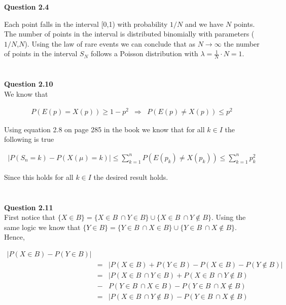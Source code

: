 \documentclass[10pt,a4paper]{article}
\begin{document}
\begin{flushleft}

\begin{eqnarray*}
\\
\end{eqnarray*}


\textbf{Question 2.4}

Each point falls in the interval [0,1) with probability $1/N$ and
we have $N$ points. The number of points in the interval is
distributed binomially with parameters ($1/N$,$N$). Using the law
of rare events we can conclude that as $N \rightarrow \infty$  the
number of points in the interval $S_N$ follows a Poisson
distribution with $\lambda=\frac{1}{N}\cdot N=1$.


\begin{eqnarray*}
\\
\end{eqnarray*}

\textbf{Question 2.10}\\


We know that

\begin{eqnarray*}
P(E(p)=X(p))\geq 1-p^2  &\Rightarrow&  P(E(p)\neq X(p))\leq p^2
\end{eqnarray*}

Using equation 2.8 on page 285 in the book we know that for all
$k\in I$ the following is true

\begin{eqnarray*}
|P(S_n=k)-P(X(\mu)=k)|\leq \sum_{k=1}^n P(E(p_k)\neq X(p_k))\leq
\sum_{k=1}^n p_k^2
\end{eqnarray*}

Since this holds for all $k\in I$ the desired result holds.


\begin{eqnarray*}
\\
\end{eqnarray*}

\textbf{Question 2.11}\\


First notice that $\{X \in B\}=\{X \in B\ \cap Y \in B\}\cup \{X
\in B\ \cap Y \not \in B\}$. Using the same logic we know that
$\{Y \in B\}=\{Y \in B\ \cap X \in B\}\cup \{Y \in B\ \cap X \not
\in B\}$. Hence,


\begin{eqnarray*}
|P(X \in B)-P(Y \in B)|&&\\
&=& | P(X \in B) + P(Y \in B) - P(X\in B)-  P(Y \not \in B)|\\
&=& |P(X \in B\ \cap Y \in B) + P(X \in B\ \cap Y \not \in B)\\
&-&P(Y \in B\ \cap X \in B) - P(Y \in B\ \cap X \not \in B)\\
&=& |P(X \in B\ \cap Y \not \in B)- P(Y \in B\ \cap X \not \in B)\\
\end{eqnarray*}


\end{flushleft}
\end{document}
